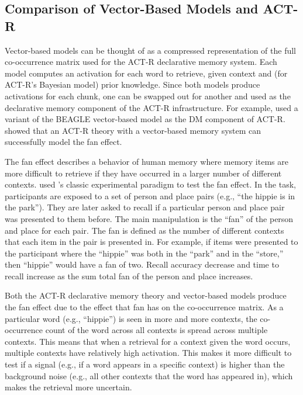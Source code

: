 \documentclass[man,floatsintext,donotrepeattitle]{apa6}
\begin{document}
\subsection{Comparison of Vector-Based Models and ACT-R}

Vector-based models can be thought of as a compressed representation of the full co-occurrence matrix used for the ACT-R declarative memory system.
Each model computes an activation for each word to retrieve, given context and (for ACT-R's Bayesian model) prior knowledge.
Since both models produce activations for each chunk, one can be swapped out for another and used as the declarative memory component of the ACT-R infrastructure.
For example, \textcite{Rutledge2007} used a variant of the BEAGLE vector-based model as the DM component of ACT-R.
\citeauthor{Rutledge2008} showed that an ACT-R theory with a vector-based memory system can successfully model the fan effect.

The fan effect describes a behavior of human memory where memory items are more difficult to retrieve if they have occurred in a larger number of different contexts.
\textcite{Rutledge2008} used \textcite{Anderson1974}'s classic experimental paradigm to test the fan effect.
In the task, participants are exposed to a set of person and place pairs (e.g., ``the hippie is in the park'').
They are later asked to recall if a particular person and place pair was presented to them before.
The main manipulation is the ``fan'' of the person and place for each pair.
The fan is defined as the number of different contexts that each item in the pair is presented in.
For example, if items were presented to the participant where the ``hippie'' was both in the ``park'' and in the ``store,'' then ``hippie'' would have a fan of two.
Recall accuracy decrease and time to recall increase as the sum total fan of the person and place increases.

Both the ACT-R declarative memory theory and vector-based models produce the fan effect due to the effect that fan has on the co-occurrence matrix.
As a particular word (e.g., ``hippie'') is seen in more and more contexts, the co-occurrence count of the word across all contexts is spread across multiple contexts.
This means that when a retrieval for a context given the word occurs, multiple contexts have relatively high activation.
This makes it more difficult to test if a signal (e.g., if a word appears in a specific context) is higher than the background noise (e.g., all other contexts that the word has appeared in),
which makes the retrieval more uncertain.
\end{document}
